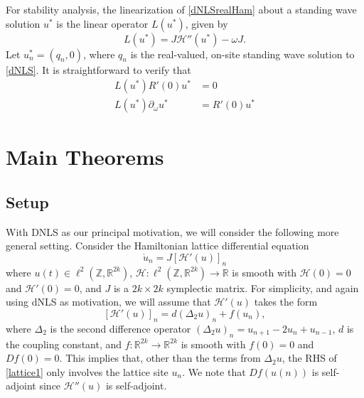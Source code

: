 \documentclass[12pt]{article}
\def\R{{\mathbb R}}
\def\Z{{\mathbb Z}}
\begin{document}
For stability analysis, the linearization of \eqref{dNLSrealHam} about a standing wave solution $u^*$ is the linear operator $L(u^*)$, given by 
\begin{equation}\label{dNLSeigproblem}
L(u^*) = J \mathcal{H}''(u^*)  - \omega J.
\end{equation}
Let $u^*_n = (q_n, 0)$, where $q_n$ is the real-valued, on-site standing wave solution to \eqref{dNLS}. It is straightforward to verify that
\begin{equation}\label{dNLSkernel1}
\begin{aligned}
L(u^*) R'(0) u^* &= 0 \\
L(u^*) \partial_\omega u^* &= R'(0) u^*
\end{aligned}
\end{equation}

\section{Main Theorems}

\subsection{Setup}

With DNLS as our principal motivation, we will consider the following more general setting. Consider the Hamiltonian lattice differential equation 
\begin{equation}\label{lattice1}
\dot{u}_n = J [\mathcal{H}'(u)]_n
\end{equation}
where $u(t) \in \ell^2(\Z, \R^{2k})$, $\mathcal{H}: \ell^2(\Z, \R^{2k}) \rightarrow \R$ is smooth with $\mathcal{H}(0) = 0$ and $\mathcal{H}'(0) = 0$, and $J$ is a $2k \times 2k$ symplectic matrix. For simplicity, and again using dNLS as motivation, we will assume that $\mathcal{H}'(u)$ takes the form
\begin{equation}\label{latticeform}
[\mathcal{H}'(u)]_n = d (\Delta_2 u)_n + f(u_n),
\end{equation}
where $\Delta_2$ is the second difference operator $(\Delta_2 u)_n = u_{n+1} - 2 u_n + u_{n-1}$, $d$ is the coupling constant, and $f: \R^{2k} \rightarrow \R^{2k}$ is smooth with $f(0) = 0$ and $Df(0) = 0$. This implies that, other than the terms from $\Delta_2 u$, the RHS of \eqref{lattice1} only involves the lattice site $u_n$. We note that $Df(u(n))$ is self-adjoint since $\mathcal{H}''(u)$ is self-adjoint.
\end{document}
